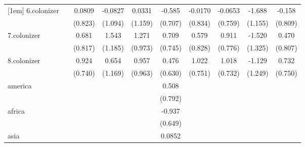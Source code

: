 {\begin{tabular}{l*{9}{c}}
[1em]
6.colonizer &                     &      0.0809         &     -0.0827         &      0.0331         &      -0.585         &     -0.0170         &     -0.0653         &      -1.688         &      -0.158         \\
            &                     &     (0.823)         &     (1.094)         &     (1.159)         &     (0.707)         &     (0.834)         &     (0.759)         &     (1.155)         &     (0.809)         \\
[1em]
7.colonizer &                     &       0.681         &       1.543         &       1.271         &       0.709         &       0.579         &       0.911         &      -1.520         &       0.470         \\
            &                     &     (0.817)         &     (1.185)         &     (0.973)         &     (0.745)         &     (0.828)         &     (0.776)         &     (1.325)         &     (0.807)         \\
[1em]
8.colonizer &                     &       0.924         &       0.654         &       0.957         &       0.476         &       1.022         &       1.018         &      -1.129         &       0.732         \\
            &                     &     (0.740)         &     (1.169)         &     (0.963)         &     (0.630)         &     (0.751)         &     (0.732)         &     (1.249)         &     (0.750)         \\
[1em]
america     &                     &                     &                     &                     &       0.508         &                     &                     &                     &                     \\
            &                     &                     &                     &                     &     (0.792)         &                     &                     &                     &                     \\
[1em]
africa      &                     &                     &                     &                     &      -0.937         &                     &                     &                     &                     \\
            &                     &                     &                     &                     &     (0.649)         &                     &                     &                     &                     \\
[1em]
asia        &                     &                     &                     &                     &      0.0852         &                     &                     &                     &                     \\

\end{tabular}}
